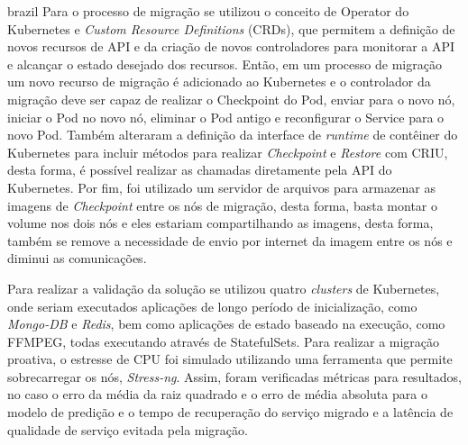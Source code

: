 \begin{otherlanguage*}{brazil}
Para o processo de migração se utilizou o conceito de Operator do Kubernetes
e \textit{Custom Resource Definitions} (CRDs), que permitem a definição de
novos recursos de API e da criação de novos controladores para monitorar a
API e alcançar o estado desejado dos recursos. Então, em um processo de
migração um novo recurso de migração é adicionado ao Kubernetes e o
controlador da migração deve ser capaz de realizar o Checkpoint do Pod, enviar
para o novo nó, iniciar o Pod no novo nó, eliminar o Pod antigo e reconfigurar
o Service para o novo Pod. Também alteraram a definição da interface de
\textit{runtime} de contêiner do Kubernetes para incluir métodos para realizar
\textit{Checkpoint} e \textit{Restore} com CRIU, desta forma, é possível realizar
as chamadas diretamente pela API do Kubernetes. Por fim, foi utilizado um servidor
de arquivos para armazenar as imagens de \textit{Checkpoint} entre os nós de
migração, desta forma, basta montar o volume nos dois nós e eles estariam
compartilhando as imagens, desta forma, também se remove a necessidade de envio
por internet da imagem entre os nós e diminui as comunicações.

Para realizar a validação da solução se utilizou quatro \textit{clusters} de
Kubernetes, onde seriam executados aplicações de longo período de inicialização,
como \textit{Mongo-DB} e \textit{Redis}, bem como aplicações de estado baseado na
execução, como FFMPEG, todas executando através de StatefulSets. Para realizar a
migração proativa, o estresse de CPU foi simulado utilizando uma ferramenta que
permite sobrecarregar os nós, \textit{Stress-ng}. Assim, foram verificadas métricas
para resultados, no caso o erro da média da raiz quadrado e o erro de média absoluta
para o modelo de predição e o tempo de recuperação do serviço migrado e a latência
de qualidade de serviço evitada pela migração.


\end{otherlanguage*}
